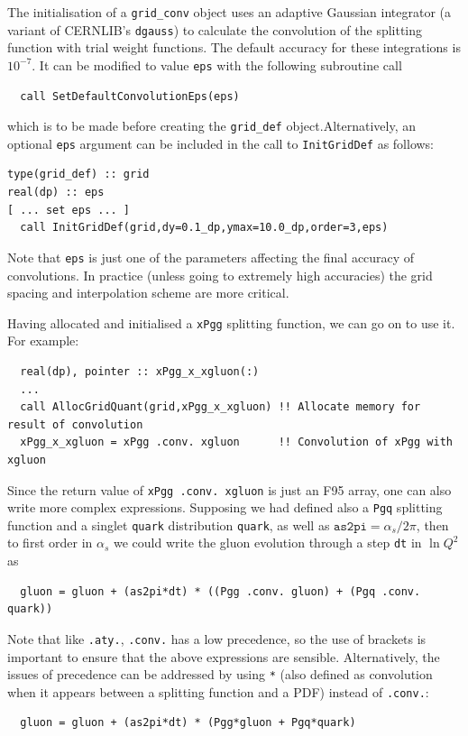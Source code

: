 \documentclass[12pt]{article}
\newcommand{\as}{\alpha_s}
\newcommand{\ttt}[1]{\texttt{#1}}
\begin{document}
The initialisation of a \texttt{grid\_conv} object uses an adaptive
Gaussian integrator (a variant of CERNLIB's \texttt{dgauss}) to
calculate the convolution of the splitting function with trial weight
functions. The default accuracy for these integrations is $10^{-7}$.
It can be modified to value \texttt{eps} with the following subroutine
call
\begin{lstlisting}
  call SetDefaultConvolutionEps(eps)
\end{lstlisting}
which is to be made before creating the \ttt{grid\_def}
object.Alternatively, an optional \ttt{eps} argument can be
  included in the call to \ttt{InitGridDef} as follows:
\begin{lstlisting}
type(grid_def) :: grid
real(dp) :: eps
[ ... set eps ... ]
  call InitGridDef(grid,dy=0.1_dp,ymax=10.0_dp,order=3,eps)
 \end{lstlisting}
Note that {\tt eps} is just
one of the parameters affecting the final accuracy of convolutions. In
practice (unless going to extremely high accuracies) the grid spacing
and interpolation scheme are more critical.

Having allocated and initialised a \texttt{xPgg} splitting function, we
can go on to use it. For example: 
\begin{lstlisting}
  real(dp), pointer :: xPgg_x_xgluon(:)
  ...
  call AllocGridQuant(grid,xPgg_x_xgluon) !! Allocate memory for result of convolution
  xPgg_x_xgluon = xPgg .conv. xgluon      !! Convolution of xPgg with xgluon
\end{lstlisting}  
Since the return value of \texttt{xPgg .conv.\ xgluon} is just an F95
array, one can also write more complex expressions. Supposing we had
defined also a \texttt{Pgq} splitting function and a singlet
\texttt{quark} distribution \ttt{quark}, 
as well as $\texttt{as2pi} = \as/2\pi$,
then to first order in $\as$ we could write the gluon evolution
through a step \texttt{dt} in $\ln Q^2$ as
\begin{lstlisting}
  gluon = gluon + (as2pi*dt) * ((Pgg .conv. gluon) + (Pgq .conv. quark))
\end{lstlisting}
Note that like \texttt{.aty.}, \texttt{.conv.} has a low precedence,
so the use of brackets is important to ensure that the above
expressions are sensible. Alternatively, the issues of precedence can
be addressed by using \texttt{*} (also defined as convolution when it
appears between a splitting function and a PDF) instead of
\texttt{.conv.}:
\begin{lstlisting}
  gluon = gluon + (as2pi*dt) * (Pgg*gluon + Pgq*quark)
\end{lstlisting}
\end{document}
